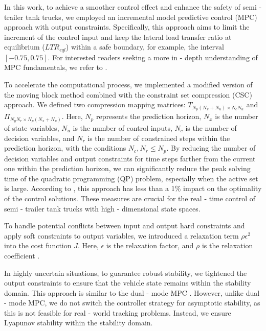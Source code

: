 In this work, to achieve a smoother control effect and enhance the safety of semi - trailer tank trucks, we employed an incremental model predictive control (MPC) approach with output constraints. Specifically, this approach aims to limit the increment of the control input and keep the lateral load transfer ratio at equilibrium ($LTR_{eql}$) within a safe boundary, for example, the interval $[-0.75, 0.75]$. For interested readers seeking a more in - depth understanding of MPC fundamentals, we refer to \cite{BookMPC}.

To accelerate the computational process, we implemented a modified version of the moving block method \cite{Cutler1980DynamicMatrixControl} combined with the constraint set compression (CSC) approach. We defined two compression mapping matrices: $T_{N_p(N_x + N_u)\times N_cN_u}$ and $\Pi_{N_yN_r\times N_p(N_x + N_u)}$. Here, $N_p$ represents the prediction horizon, $N_x$ is the number of state variables, $N_u$ is the number of control inputs, $N_c$ is the number of decision variables, and $N_r$ is the number of constrained steps within the prediction horizon, with the conditions $N_c, N_r \leq N_p$. By reducing the number of decision variables and output constraints for time steps farther from the current one within the prediction horizon, we can significantly reduce the peak solving time of the quadratic programming (QP) problem, especially when the active set is large. According to \cite{EbenLi_FastMPC}, this approach has less than a 1\% impact on the optimality of the control solutions. These measures are crucial for the real - time control of semi - trailer tank trucks with high - dimensional state spaces.

To handle potential conflicts between input and output hard constraints and apply soft constraints to output variables, we introduced a relaxation term $\rho\epsilon^2$ into the cost function $J$. Here, $\epsilon$ is the relaxation factor, and $\rho$ is the relaxation coefficient \cite{soft_constraint_Eben2010}. 

In highly uncertain situations, to guarantee robust stability, we tightened the output constraints to ensure that the vehicle state remains within the stability domain. This approach is similar to the dual - mode MPC \cite{soft_constraint_Eben2010}. However, unlike dual - mode MPC, we do not switch the controller strategy for asymptotic stability, as this is not feasible for real - world tracking problems. Instead, we ensure Lyapunov stability within the stability domain.

